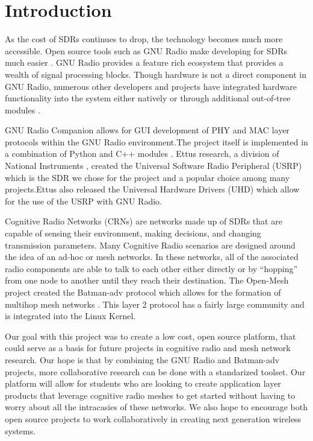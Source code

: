 \section{Introduction}

As the cost of SDRs continues to drop, the technology becomes much more accessible. Open source tools such as GNU Radio make developing for SDRs much easier \cite{0003}. GNU Radio provides a feature rich ecosystem that provides a wealth of signal processing blocks. Though hardware is not a direct component in GNU Radio, numerous other developers and projects have integrated hardware functionality into the system either natively or through additional out-of-tree modules \cite{0004} \cite{0005}.

GNU Radio Companion allows for GUI development of PHY and MAC layer protocols within the GNU Radio environment.The project itself is implemented in a combination of Python and C++ modules \cite{0003}. Ettus research, a division of National Instruments \cite{0006}, created the Universal Software Radio Peripheral (USRP) which is the SDR we chose for the project and a popular choice among many projects.Ettus also released the Universal Hardware Drivers (UHD) \cite{0007} which allow for the use of the USRP with GNU Radio.   

Cognitive Radio Networks (CRNs) are networks made up of SDRs that are capable of sensing their environment, making decisions, and changing transmission parameters. Many Cognitive Radio scenarios are designed around the idea of an ad-hoc or mesh networks. In these networks, all of the associated radio components are able to talk to each other either directly or by ``hopping'' from one node to another until they reach their destination. The Open-Mesh project created the Batman-adv protocol which allows for the formation of multihop mesh networks \cite{0008}. This layer 2 protocol has a fairly large community and is integrated into the Linux Kernel. 

Our goal with this project was to create a low cost, open source platform, that could serve as a basis for future projects in cognitive radio and mesh network research. Our hope is that by combining the GNU Radio and Batman-adv projects, more collaborative research can be done with a standarized toolset. Our platform will allow for students who are looking to create application layer products that leverage cognitive radio meshes to get started without having to worry about all the intracasies of these networks. We also hope to encourage both open source projects to work collaboratively in creating next generation wireless systems. 
